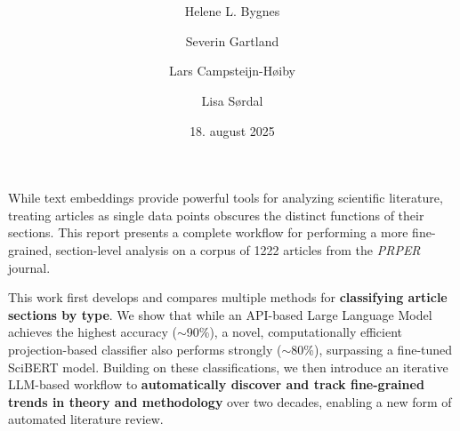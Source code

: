 \documentclass[12pt]{article}
\title{\maintitle\: \shorttitle}
\author{Helene L. Bygnes \and Severin Gartland \and Lars Campsteijn-Høiby \and Lisa Sørdal}
\date{18. august 2025}
\newcommand{\displayauthors}{Helene L. Bygnes \\ Severin Gartland \\ Lars Campsteijn-Høiby \\ Lisa Sørdal}
\begin{document}
\begin{titlepage}


    \vfill
    \begin{flushright}
        \begin{minipage}{0.85\textwidth}
            \setlength\parskip{0pt} \setlength\parskip{15pt} %
            {
                While text embeddings provide powerful tools for analyzing scientific literature, treating articles as single data points obscures the distinct functions of their sections. This report presents a complete workflow for performing a more fine-grained, section-level analysis on a corpus of 1222 articles from the \emph{PRPER} journal.

                This work first develops and compares multiple methods for \textbf{classifying article sections by type}. We show that while an API-based Large Language Model achieves the highest accuracy ($\sim$90\%), a novel, computationally efficient projection-based classifier also performs strongly ($\sim$80\%), surpassing a fine-tuned SciBERT model. Building on these classifications, we then introduce an iterative LLM-based workflow to \textbf{automatically discover and track fine-grained trends in theory and methodology} over two decades, enabling a new form of automated literature review.
            }
        \end{minipage}
    \end{flushright}


\end{titlepage}
\end{document}

